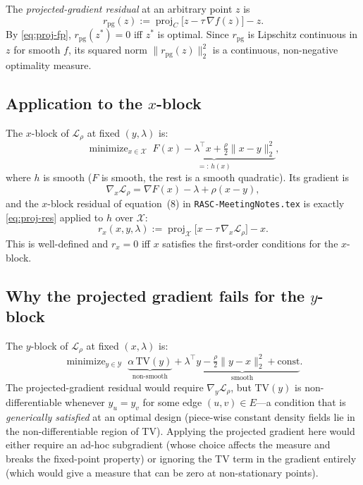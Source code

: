 \documentclass[11pt]{article}
\newcommand{\proj}{\operatorname{proj}}
\newcommand{\TV}{\mathrm{TV}}
\newcommand{\mini}{\mathop{\mathrm{minimize}}}
\theoremstyle{plain}
\theoremstyle{remark}
\begin{document}
The \emph{projected-gradient residual} at an arbitrary point $z$ is
\begin{equation}\label{eq:proj-res}
  r_{\mathrm{pg}}(z) := \proj_C\!\bigl[z - \tau\,\nabla f(z)\bigr] - z.
\end{equation}
By \eqref{eq:proj-fp}, $r_{\mathrm{pg}}(z^*) = 0$ iff $z^*$ is optimal.
Since $r_{\mathrm{pg}}$ is Lipschitz continuous in $z$ for smooth $f$, its
squared norm $\|r_{\mathrm{pg}}(z)\|_2^2$ is a continuous, non-negative
optimality measure.

\subsection{Application to the $x$-block}

The $x$-block of $\mathcal{L}_\rho$ at fixed $(y,\lambda)$ is:
\[
  \mini_{x\in\mathcal{X}}\;
  \underbrace{F(x) - \lambda^\top x + \tfrac{\rho}{2}\|x - y\|_2^2}_{=:\,h(x)},
\]
where $h$ is smooth ($F$ is smooth, the rest is a smooth quadratic).  Its
gradient is
\[
  \nabla_x \mathcal{L}_\rho
  = \nabla F(x) - \lambda + \rho(x - y),
\]
and the $x$-block residual of equation~(8) in \texttt{RASC-MeetingNotes.tex}
is exactly \eqref{eq:proj-res} applied to $h$ over $\mathcal{X}$:
\begin{equation}\label{eq:r_x}
  r_x(x,y,\lambda)
  := \proj_{\mathcal{X}}\!\bigl[x - \tau\,\nabla_x \mathcal{L}_\rho\bigr] - x.
\end{equation}
This is well-defined and $r_x = 0$ iff $x$ satisfies the first-order
conditions for the $x$-block.

\subsection{Why the projected gradient fails for the $y$-block}

The $y$-block of $\mathcal{L}_\rho$ at fixed $(x,\lambda)$ is:
\[
  \mini_{y\in\mathcal{Y}}\;
  \underbrace{\alpha\,\TV(y)}_{\text{non-smooth}}
  + \underbrace{\lambda^\top y - \tfrac{\rho}{2}\|y - x\|_2^2 + \mathrm{const}}_{\text{smooth}}.
\]
The projected-gradient residual would require $\nabla_y \mathcal{L}_\rho$,
but $\TV(y)$ is non-differentiable whenever $y_u = y_v$ for some edge
$(u,v)\in E$---a condition that is \emph{generically satisfied} at an optimal
design (piece-wise constant density fields lie in the non-differentiable
region of TV).  Applying the projected gradient here would either require an
ad-hoc subgradient (whose choice affects the measure and breaks the
fixed-point property) or ignoring the TV term in the gradient entirely
(which would give a measure that can be zero at non-stationary points).
\end{document}
